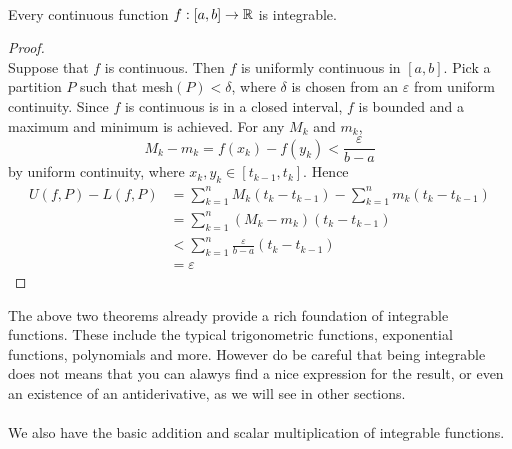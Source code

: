 \documentclass[a4paper]{article}
\begin{document}
\begin{thm}{}{}\\ Every continuous function $f:[a,b]\to\mathbb{R}$ is integrable. 
\begin{proof}\\ Suppose that $f$ is continuous. Then $f$ is uniformly continuous in $[a,b]$. Pick a partition $P$ such that mesh$(P)<\delta$, where $\delta$ is chosen from an $\varepsilon$ from uniform continuity. Since $f$ is continuous is in a closed interval, $f$ is bounded and a maximum and minimum is achieved. For any $M_k$ and $m_k$, $$M_k-m_k=f(x_k)-f(y_k)<\frac{\varepsilon}{b-a}$$ by uniform continuity, where $x_k,y_k\in[t_{k-1},t_k]$. Hence 
\begin{align*}
U(f,P)-L(f,P)&=\sum_{k=1}^nM_k(t_k-t_{k-1})-\sum_{k=1}^nm_k(t_k-t_{k-1})\\
&=\sum_{k=1}^n(M_k-m_k)(t_k-t_{k-1})\\
&<\sum_{k=1}^n\frac{\varepsilon}{b-a}(t_k-t_{k-1})\\
&=\varepsilon
\end{align*}
\end{proof}
\end{thm}

The above two theorems already provide a rich foundation of integrable functions. These include the typical trigonometric functions, exponential functions, polynomials and more. However do be careful that being integrable does not means that you can alawys find a nice expression for the result, or even an existence of an antiderivative, as we will see in other sections. \\~\\
We also have the basic addition and scalar multiplication of integrable functions. 
\end{document}
